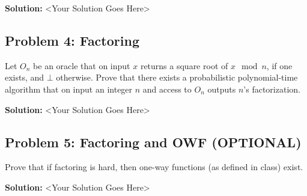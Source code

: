 \documentclass[12pt]{article}
\begin{document}
\textbf{Solution: } <Your Solution Goes Here>

\newpage

\subsection*{Problem 4: Factoring }

Let $O_n$ be an oracle that on input $x$ returns a square root of $x
\mod n$, if one exists, and $\bot$ otherwise. Prove that there
exists a probabilistic polynomial-time algorithm that on input an
integer $n$ and access to  $O_n$ outputs $n$'s factorization.


\textbf{Solution: } <Your Solution Goes Here>

\newpage

\subsection*{Problem 5: Factoring and OWF (OPTIONAL)}

Prove that if factoring is hard, then one-way
  functions (as defined in class) exist.

\textbf{Solution: } <Your Solution Goes Here>
\end{document}
